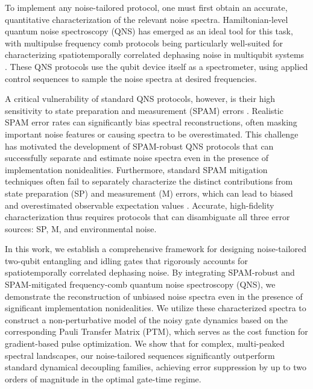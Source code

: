 \documentclass[%
 reprint,
superscriptaddress,
 amsmath,amssymb,
 aps,
pra,
]{revtex4-2}
\begin{document}
To implement any noise-tailored protocol, one must first obtain an accurate, quantitative characterization of the relevant noise spectra. Hamiltonian-level quantum noise spectroscopy (QNS) has emerged as an ideal tool for this task, with multipulse frequency comb protocols being particularly well-suited for characterizing spatiotemporally correlated dephasing noise in multiqubit systems \cite{CombMultiaxis, PhysRevA.94.012109, PhysRevA.95.022121, PhysRevLett.116.150503}. These QNS protocols use the qubit device itself as a spectrometer, using applied control sequences to sample the noise spectra at desired frequencies.

A critical vulnerability of standard QNS protocols, however, is their high sensitivity to state preparation and measurement (SPAM) errors \cite{PhysRevApplied.22.024074}. Realistic SPAM error rates can significantly bias spectral reconstructions, often masking important noise features or causing spectra to be overestimated. This challenge has motivated the development of SPAM-robust QNS protocols that can successfully separate and estimate noise spectra even in the presence of implementation nonidealities. Furthermore, standard SPAM mitigation techniques often fail to separately characterize the distinct contributions from state preparation (SP) and measurement (M) errors, which can lead to biased and overestimated observable expectation values \cite{khan2025}. Accurate, high-fidelity characterization thus requires protocols that can disambiguate all three error sources: SP, M, and environmental noise.

In this work, we establish a comprehensive framework for designing noise-tailored two-qubit entangling and idling gates that rigorously accounts for spatiotemporally correlated dephasing noise. By integrating SPAM-robust and SPAM-mitigated frequency-comb quantum noise spectroscopy (QNS), we demonstrate the reconstruction of unbiased noise spectra even in the presence of significant implementation nonidealities. We utilize these characterized spectra to construct a non-perturbative model of the noisy gate dynamics based on the corresponding Pauli Transfer Matrix (PTM), which serves as the cost function for gradient-based pulse optimization. We show that for complex, multi-peaked spectral landscapes, our noise-tailored sequences significantly outperform standard dynamical decoupling families, achieving error suppression by up to two orders of magnitude in the optimal gate-time regime.
\end{document}
